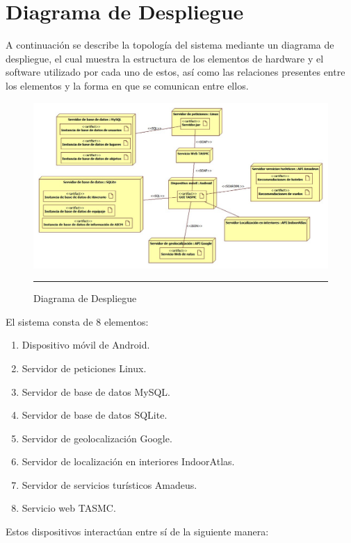 \clearpage
\section{Diagrama de Despliegue}

A continuación se describe la topología del sistema mediante un diagrama de despliegue, el cual muestra la estructura de los elementos de hardware y el software utilizado por cada uno de estos, así como las relaciones presentes entre los elementos y la forma en que se comunican entre ellos.

\begin{figure}[h]
	\centering
		\includegraphics[width=1\textwidth]{Figuras/diagramaDespliegue.png}
		\rule{30em}{0.5pt}
	\caption[Diagrama de Despliegue]{Diagrama de Despliegue}
	\label{fig:diagramaDespliegue}
\end{figure}

El sistema consta de 8 elementos:

\begin{enumerate}
	\item Dispositivo móvil de Android.
	\item Servidor de peticiones Linux.
	\item Servidor de base de datos MySQL.
	\item Servidor de base de datos SQLite.
	\item Servidor de geolocalización Google.
	\item Servidor de localización en interiores IndoorAtlas.
	\item Servidor de servicios turísticos Amadeus.
	\item Servicio web TASMC.
\end{enumerate}

Estos dispositivos interactúan entre sí de la siguiente manera: 

